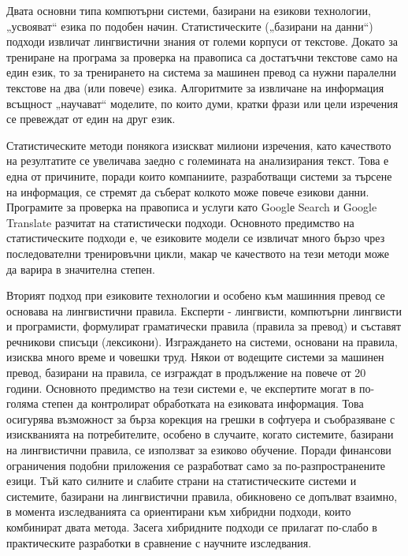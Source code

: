 \documentclass[]{../../metanetpaper}
\begin{document}
\begin{multicols}{2}

Двата основни типа компютърни системи, базирани на езикови технологии, „усвояват“ езика по подобен начин. Статистическите („базирани на данни“) подходи извличат
 лингвистични знания от големи корпуси от текстове. Докато  за трениране на програма за проверка на правописа са достатъчни текстове само на един език, то за тренирането на система за машинен превод са нужни паралелни текстове на два (или повече) езика. Алгоритмите за извличане на информация всъщност „научават“ моделите, по които думи, кратки
 фрази или цели изречения се превеждат от един на друг език. 

Статистическите методи понякога изискват милиони изречения, като качеството на резултатите се увеличава заедно с големината на анализирания
 текст. Това е една от причините, поради които компаниите, разработващи системи за търсене на информация, се стремят да съберат колкото
 може повече езикови данни. Програмите за проверка на
 правописа и услуги като Googlе Search и Google Translate разчитат на статистически подходи. Основното предимство на статистическите подходи е, че езиковите модели се извличат много бързо чрез последователни тренировъчни цикли, макар че качеството на тези методи може да варира в значителна степен.

Вторият подход при езиковите технологии и особено към машинния превод се основава на лингвистични правила. Експерти - лингвисти, компютърни лингвисти и програмисти, формулират  граматически правила (правила за превод) и съставят
 речникови списъци (лексикони). Изграждането на системи, основани на правила, изисква много време и човешки труд. 
Някои от водещите системи за машинен превод, базирани на правила, се
 изграждат в продължение на повече от 20 години. Основното предимство
 на тези системи е, че експертите могат в по-голяма степен да контролират обработката на езиковата информация. 
Това осигурява възможност за бърза корекция на грешки в софтуера и
съобразяване с изискванията на потребителите, особено в случаите, когато системите, базирани на лингвистични правила, се използват за езиково обучение.
Поради финансови ограничения подобни приложения се разработват само за
по-разпространените езици.
%
Тъй като силните и слабите страни на статистическите системи и системите, базирани на лингвистични правила, обикновено се допълват взаимно, в момента изследванията са ориентирани към хибридни подходи, които комбинират  двата метода. Засега хибридните подходи се прилагат по-слабо в практическите разработки в сравнение с научните изследвания. 


\end{multicols}
\end{document}
